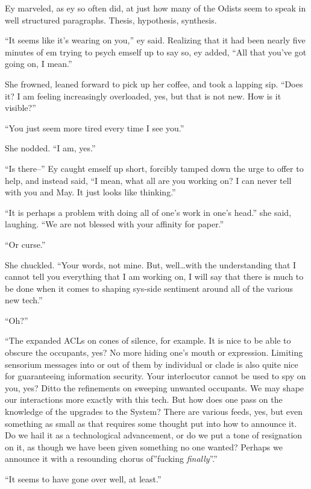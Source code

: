 Ey marveled, as ey so often did, at just how many of the Odists seem to speak in well structured paragraphs. Thesis, hypothesis, synthesis.

``It seems like it's wearing on you,'' ey said. Realizing that it had been nearly five minutes of em trying to psych emself up to say so, ey added, ``All that you've got going on, I mean.''

She frowned, leaned forward to pick up her coffee, and took a lapping sip. ``Does it? I am feeling increasingly overloaded, yes, but that is not new. How is it visible?''

``You just seem more tired every time I see you.''

She nodded. ``I am, yes.''

``Is there--'' Ey caught emself up short, forcibly tamped down the urge to offer to help, and instead said, ``I mean, what all are you working on? I can never tell with you and May. It just looks like thinking.''

``It is perhaps a problem with doing all of one's work in one's head.'' she said, laughing. ``We are not blessed with your affinity for paper.''

``Or curse.''

She chuckled. ``Your words, not mine. But, well\ldots with the understanding that I cannot tell you everything that I am working on, I will say that there is much to be done when it comes to shaping sys-side sentiment around all of the various new tech.''

``Oh?''

``The expanded ACLs on cones of silence, for example. It is nice to be able to obscure the occupants, yes? No more hiding one's mouth or expression. Limiting sensorium messages into or out of them by individual or clade is also quite nice for guaranteeing information security. Your interlocutor cannot be used to spy on you, yes? Ditto the refinements on sweeping unwanted occupants. We may shape our interactions more exactly with this tech. But how does one pass on the knowledge of the upgrades to the System? There are various feeds, yes, but even something as small as that requires some thought put into how to announce it. Do we hail it as a technological advancement, or do we put a tone of resignation on it, as though we have been given something no one wanted? Perhaps we announce it with a resounding chorus of''fucking \emph{finally}''.''

``It seems to have gone over well, at least.''

